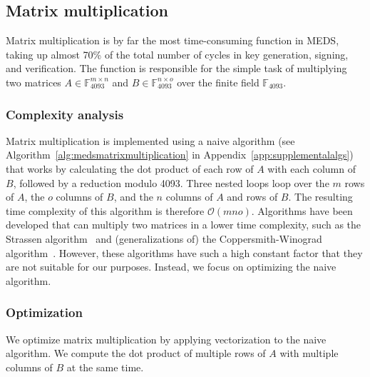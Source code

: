 \documentclass[11pt,a4paper]{report}
\theoremstyle{definition}
\begin{document}
\subsection{Matrix multiplication}
\label{sec:matrixmultiplication}
Matrix multiplication is by far the most time-consuming function in MEDS, taking up almost 70\% of the total number of cycles in key generation, signing, and verification. The function is responsible for the simple task of multiplying two matrices $A \in \mathbb{F}_{4093}^{m \times n}$ and $B \in \mathbb{F}_{4093}^{n \times o}$ over the finite field $\mathbb{F}_{4093}$.

\subsubsection{Complexity analysis}
\label{sec:matrixmultiplicationcomplexity}
Matrix multiplication is implemented using a naive algorithm (see Algorithm~\ref{alg:medsmatrixmultiplication} in Appendix~\ref{app:supplementalalgs}) that works by calculating the dot product of each row of $A$ with each column of $B$, followed by a reduction modulo 4093. Three nested loops loop over the $m$ rows of $A$, the $o$ columns of $B$, and the $n$ columns of $A$ and rows of $B$. The resulting time complexity of this algorithm is therefore $\mathcal{O}(mno)$. Algorithms have been developed that can multiply two matrices in a lower time complexity, such as the Strassen algorithm~\cite{strassen1969gaussian} and (generalizations of) the Coppersmith-Winograd algorithm~\cite{coppersmith1987matrix}. However, these algorithms have such a high constant factor that they are not suitable for our purposes. Instead, we focus on optimizing the naive algorithm.

\subsubsection{Optimization}
\label{sec:matrixmultiplicationoptimization}
We optimize matrix multiplication by applying vectorization to the naive algorithm. We compute the dot product of multiple rows of $A$ with multiple columns of $B$ at the same time.
\end{document}
